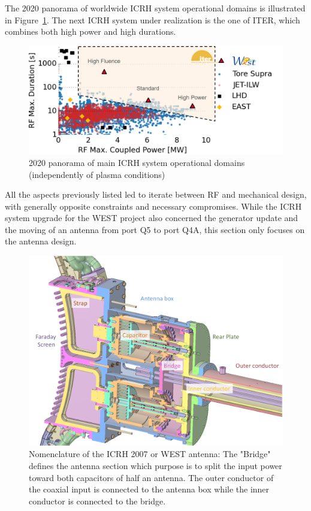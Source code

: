 The 2020 panorama of worldwide ICRH system operational domains is illustrated in Figure~\ref{fig:westicrhcomparaisonothermachines}. The next ICRH system under realization is the one of ITER, which combines both high power and high durations. 

\begin{figure}[h]
	\centering
	\includegraphics[width=1.0\linewidth]{figures/chap3/WEST_ICRH/WEST_ICRH_comparaison_other_machines}
	\caption{2020 panorama of main ICRH system operational domains (independently of plasma conditions)}
	\label{fig:westicrhcomparaisonothermachines}
\end{figure}

All the aspects previously listed led to iterate between RF and mechanical design, with generally opposite constraints and necessary compromises. While the ICRH system upgrade for the WEST project also concerned the generator update and the moving of an antenna from port Q5 to port Q4A, this section only focuses on the antenna design. 


\begin{figure}
	\centering
	\includegraphics[width=0.7\linewidth]{figures/chap3/WEST_ICRH/proto2007_antenna_cut}
	\caption{Nomenclature of the ICRH 2007 or WEST antenna: The "Bridge" defines the antenna section which purpose is to split the input power toward both capacitors of half an antenna. The outer conductor of the coaxial input is connected to the antenna box while the inner conductor is connected to the bridge.}
	\label{fig:proto2007antennacut}
\end{figure}


